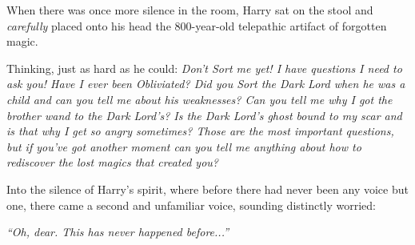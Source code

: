 When there was once more silence in the room, Harry sat on the stool and \emph{carefully} placed onto his head the 800-year-old telepathic artifact of forgotten magic.

Thinking, just as hard as he could: \emph{Don’t Sort me yet! I have questions I need to ask you! Have I ever been Obliviated? Did you Sort the Dark Lord when he was a child and can you tell me about his weaknesses? Can you tell me why I got the brother wand to the Dark Lord’s? Is the Dark Lord’s ghost bound to my scar and is that why I get so angry sometimes? Those are the most important questions, but if you’ve got another moment can you tell me anything about how to rediscover the lost magics that created you?}

Into the silence of Harry’s spirit, where before there had never been any voice but one, there came a second and unfamiliar voice, sounding distinctly worried:

\emph{“Oh, dear. This has never happened before...”}


